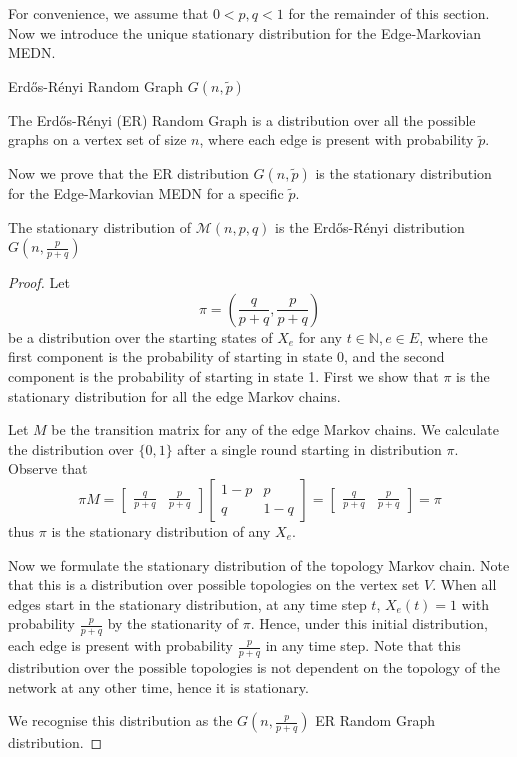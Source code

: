 For convenience, we assume that $0 < p, q < 1$ for the remainder of this section. Now we introduce the unique stationary distribution for the Edge-Markovian MEDN. 

\begin{definition}
	Erdős-Rényi Random Graph $G(n,\tilde{p})$

	\noindent	
	The Erdős-Rényi (ER) Random Graph is a distribution over all the possible graphs on a vertex set of size $n$, where each edge is present with probability $\tilde{p}$.
\end{definition}

Now we prove that the ER distribution $G(n,\tilde{p})$ is the stationary distribution for the Edge-Markovian MEDN for a specific $\tilde{p}$.

\begin{lemma}
	The stationary distribution of $\mathcal{M}(n, p, q)$ is the Erdős-Rényi distribution $G(n, \frac{p}{p+q})$ 
\end{lemma}

\begin{proof}
	Let 
	$$
		\pi = \left(\frac{q}{p+q}, \frac{p}{p+q}\right)
	$$ 
	be a distribution over the starting states of $X_e$ for any $t \in \mathbb{N}, e \in E$, %
	where the first component is the probability of starting in state 0, and the second component is the probability of starting in state 1. First we show that $\pi$ is the stationary distribution for all the edge Markov chains.

	Let $M$ be the transition matrix for any of the edge Markov chains. We calculate the distribution over $\{0,1\}$ after a single round starting in distribution $\pi$. Observe that
	$$
		\pi M =
		\begin{bmatrix}
			\frac{q}{p+q} & \frac{p}{p+q}
		\end{bmatrix}
		\begin{bmatrix}
			1 - p & p \\
			q & 1 - q 
		\end{bmatrix}
		= \begin{bmatrix}
			\frac{q}{p+q} & \frac{p}{p+q}
		\end{bmatrix}
		= \pi
	$$
	thus $\pi$ is the stationary distribution of any $X_e$.
	
	Now we formulate the stationary distribution of the topology Markov chain. Note that this is a distribution over possible topologies on the vertex set $V$. When all edges start in the stationary distribution, at any time step $t$, $X_e(t) = 1$ with probability $\frac{p}{p+q}$ by the stationarity of $\pi$. Hence, under this initial distribution, each edge is present with probability $\frac{p}{p+q}$ in any time step. Note that this distribution over the possible topologies is not dependent on the topology of the network at any other time, hence it is stationary. %

	We recognise this distribution as the $G(n, \frac{p}{p+q})$ ER Random Graph distribution.
\end{proof}

